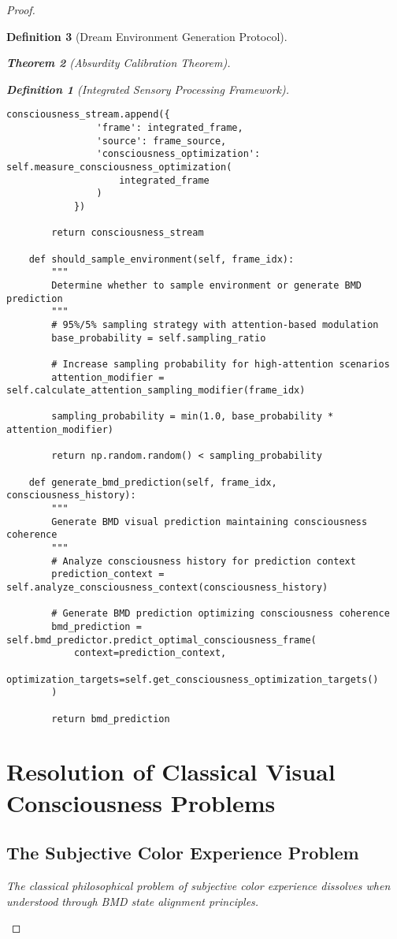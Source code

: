 \documentclass[12pt,a4paper]{article}
\newtheorem{theorem}{Theorem}[section]
\newtheorem{definition}[theorem]{Definition}
\begin{document}
\begin{proof}
\begin{definition}[Dream Environment Generation Protocol]
\begin{theorem}[Absurdity Calibration Theorem]
\begin{observation}
\begin{definition}[Integrated Sensory Processing Framework]
\begin{lstlisting}[style=pythonstyle, caption=Visual Memory BMD Integration]
            consciousness_stream.append({
                'frame': integrated_frame,
                'source': frame_source,
                'consciousness_optimization': self.measure_consciousness_optimization(
                    integrated_frame
                )
            })
        
        return consciousness_stream
    
    def should_sample_environment(self, frame_idx):
        """
        Determine whether to sample environment or generate BMD prediction
        """
        # 95%/5% sampling strategy with attention-based modulation
        base_probability = self.sampling_ratio
        
        # Increase sampling probability for high-attention scenarios
        attention_modifier = self.calculate_attention_sampling_modifier(frame_idx)
        
        sampling_probability = min(1.0, base_probability * attention_modifier)
        
        return np.random.random() < sampling_probability
    
    def generate_bmd_prediction(self, frame_idx, consciousness_history):
        """
        Generate BMD visual prediction maintaining consciousness coherence
        """
        # Analyze consciousness history for prediction context
        prediction_context = self.analyze_consciousness_context(consciousness_history)
        
        # Generate BMD prediction optimizing consciousness coherence
        bmd_prediction = self.bmd_predictor.predict_optimal_consciousness_frame(
            context=prediction_context,
            optimization_targets=self.get_consciousness_optimization_targets()
        )
        
        return bmd_prediction
\end{lstlisting}

\section{Resolution of Classical Visual Consciousness Problems}

\subsection{The Subjective Color Experience Problem}

The classical philosophical problem of subjective color experience dissolves when understood through BMD state alignment principles.


\end{definition}
\end{observation}
\end{theorem}
\end{definition}
\end{proof}
\end{document}

